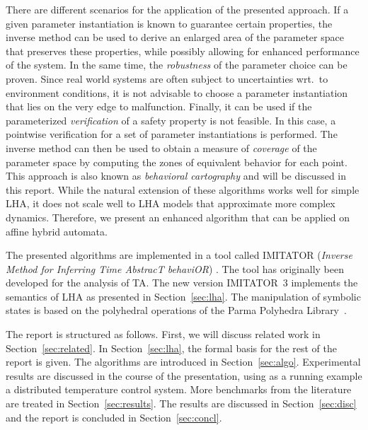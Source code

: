 \documentclass{llncs}
\newcommand{\sectionname}{Section}
\begin{document}
There are different scenarios for the application of the presented
approach. If a given parameter instantiation is known to guarantee
certain properties, the inverse method can be used to derive an
enlarged area of the parameter space that preserves these properties,
while possibly allowing for enhanced performance of the system. In the
same time, the \emph{robustness} of the parameter choice can be
proven. Since real world systems are often subject to uncertainties
wrt.~to environment conditions, it is not advisable to choose a
parameter instantiation that lies on the very edge to
malfunction. Finally, it can be used if the parameterized
\emph{verification} of a safety property is not feasible. In this
case, a pointwise verification for a set of parameter instantiations
is performed. The inverse method can then be used to obtain a measure
of \emph{coverage} of the parameter space by computing the zones of
equivalent behavior for each point. This approach is also known as
\emph{behavioral cartography} \cite{AF:2010} and will be discussed in
this report. While the natural extension of these algorithms works well
for simple LHA, it does not scale well to LHA models that approximate
more complex dynamics. Therefore, we present an enhanced algorithm
that can be applied on affine hybrid automata.


The presented algorithms are implemented in a tool called IMITATOR
(\emph{Inverse Method for Inferring Time AbstracT behaviOR})
\cite{And:2009,And:2010}. The tool has originally been developed for the
analysis of TA. The new version IMITATOR~3 implements the semantics of
LHA as presented in \sectionname~\ref{sec:lha}. The manipulation of
symbolic states is based on the polyhedral operations of the Parma
Polyhedra Library~\cite{BHZ:2009}.

The report is structured as follows. First, we will discuss related
work in \sectionname~\ref{sec:related}. In \sectionname~\ref{sec:lha},
the formal basis for the rest of the report is given. The algorithms
are introduced in \sectionname~\ref{sec:algo}. Experimental results
are discussed in the course of the presentation, using as a running
example a distributed temperature control system. More benchmarks from
the literature are treated in \sectionname~\ref{sec:results}. The
results are discussed in \sectionname~\ref{sec:disc} and the report is
concluded in
\sectionname~\ref{sec:concl}.
\end{document}
